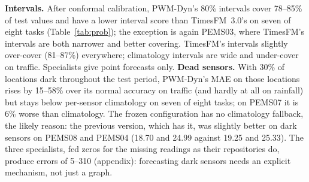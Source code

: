 \textbf{Intervals.} After conformal calibration, PWM-Dyn's 80\% intervals cover 78--85\% of test values and have a
lower interval score than TimesFM~3.0's on seven of eight tasks (Table~\ref{tab:prob}); the exception is again
PEMS03, where TimesFM's intervals are both narrower and better covering. TimesFM's intervals slightly over-cover
(81--87\%) everywhere; climatology intervals are wide and under-cover on traffic. Specialists give point forecasts only.
\textbf{Dead sensors.} With 30\% of locations dark throughout the test period, PWM-Dyn's MAE on those locations rises
by 15--58\% over its normal accuracy on traffic (and hardly at all on rainfall) but stays below per-sensor
climatology on seven of eight tasks; on PEMS07 it is
6\% worse than climatology. The frozen configuration has no climatology fallback, the likely reason: the previous version, which has it, was
slightly better on dark sensors on PEMS08 and PEMS04 (18.70 and 24.99 against 19.25 and 25.33). The three specialists, fed zeros for the missing readings as their repositories do, produce errors of
5--310 (appendix): forecasting dark sensors needs an explicit mechanism, not just a graph.
